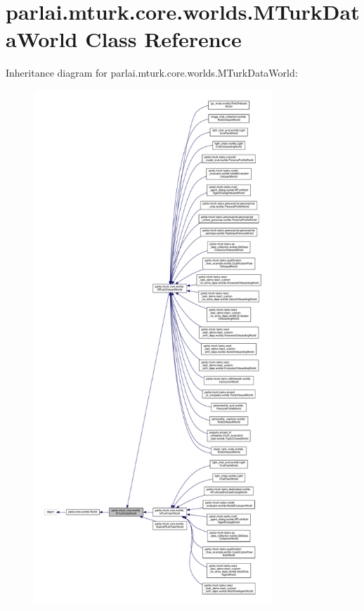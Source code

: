 \hypertarget{classparlai_1_1mturk_1_1core_1_1worlds_1_1MTurkDataWorld}{}\section{parlai.\+mturk.\+core.\+worlds.\+M\+Turk\+Data\+World Class Reference}
\label{classparlai_1_1mturk_1_1core_1_1worlds_1_1MTurkDataWorld}


Inheritance diagram for parlai.\+mturk.\+core.\+worlds.\+M\+Turk\+Data\+World\+:\nopagebreak
\begin{figure}[H]
\begin{center}
\leavevmode
\includegraphics[height=550pt]{db/dd2/classparlai_1_1mturk_1_1core_1_1worlds_1_1MTurkDataWorld__inherit__graph}
\end{center}
\end{figure}


